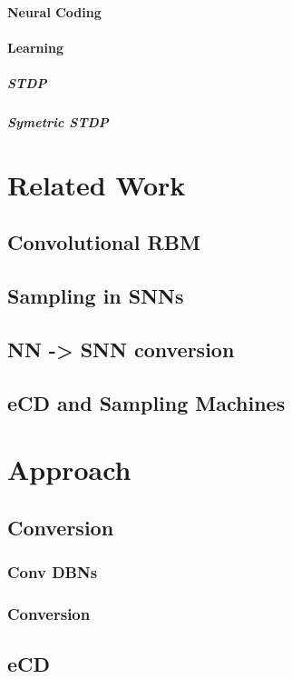 \subsubsection{Neural Coding}
\subsubsection{Learning}
\paragraph{STDP}
\paragraph{Symetric STDP}



\chapter{Related Work}
\section{Convolutional RBM}
\section{Sampling in SNNs}
\section{NN -> SNN conversion}
\section{eCD and Sampling Machines}


\chapter{Approach}
\section{Conversion}
\subsection{Conv DBNs}
\subsection{Conversion}

\section{eCD}
